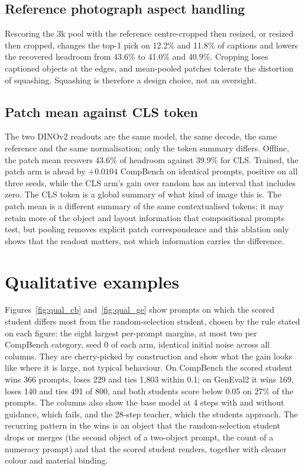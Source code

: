 \documentclass[11pt,a4paper]{article}
\begin{document}
\subsection{Reference photograph aspect handling}
Rescoring the 3k pool with the reference centre-cropped then resized, or resized then cropped, changes the top-1 pick on 12.2\% and 11.8\% of captions and lowers the recovered headroom from 43.6\% to 41.0\% and 40.9\%. Cropping loses captioned objects at the edges, and mean-pooled patches tolerate the distortion of squashing. Squashing is therefore a design choice, not an oversight.

\subsection{Patch mean against CLS token}
The two DINOv2 readouts are the same model, the same decode, the same reference and the same normalisation; only the token summary differs. Offline, the patch mean recovers 43.6\% of headroom against 39.9\% for CLS. Trained, the patch arm is ahead by $+0.0104$ CompBench on identical prompts, positive on all three seeds, while the CLS arm's gain over random has an interval that includes zero. The CLS token is a global summary of what kind of image this is. The patch mean is a different summary of the same contextualised tokens; it may retain more of the object and layout information that compositional prompts test, but pooling removes explicit patch correspondence and this ablation only shows that the readout matters, not which information carries the difference.

\clearpage
\section{Qualitative examples}
\label{sec:qual}
Figures~\ref{fig:qual_cb} and~\ref{fig:qual_ge} show prompts on which the scored student differs most from the random-selection student, chosen by the rule stated on each figure: the eight largest per-prompt margins, at most two per CompBench category, seed 0 of each arm, identical initial noise across all columns. They are cherry-picked by construction and show what the gain looks like where it is large, not typical behaviour. On CompBench the scored student wins 366 prompts, loses 229 and ties 1,803 within 0.1; on GenEval2 it wins 169, loses 140 and ties 491 of 800, and both students score below 0.05 on 27\% of the prompts. The columns also show the base model at 4 steps with and without guidance, which fails, and the 28-step teacher, which the students approach. The recurring pattern in the wins is an object that the random-selection student drops or merges (the second object of a two-object prompt, the count of a numeracy prompt) and that the scored student renders, together with cleaner colour and material binding.
\end{document}
